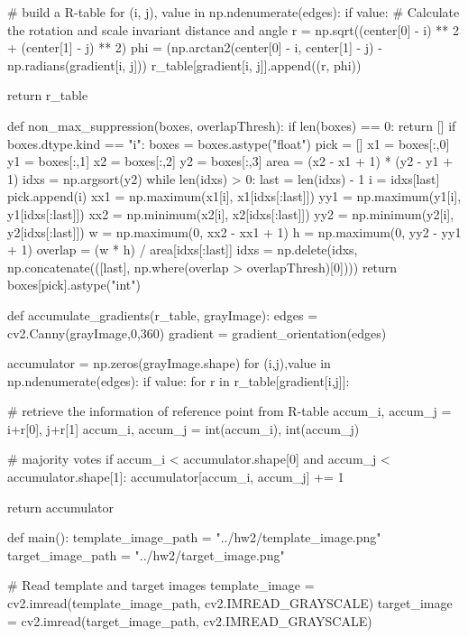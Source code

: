 \documentclass[10pt]{article}
\begin{document}
\begin{python}
    # build a R-table
    for (i, j), value in np.ndenumerate(edges):
        if value:
            # Calculate the rotation and scale invariant distance and angle
            r = np.sqrt((center[0] - i) ** 2 + (center[1] - j) ** 2)
            phi = (np.arctan2(center[0] - i, center[1] - j) - np.radians(gradient[i, j])) %
            r_table[gradient[i, j]].append((r, phi))

    return r_table

def non_max_suppression(boxes, overlapThresh):
    if len(boxes) == 0:
        return []
    if boxes.dtype.kind == "i":
        boxes = boxes.astype("float")
    pick = []
    x1 = boxes[:,0]
    y1 = boxes[:,1]
    x2 = boxes[:,2]
    y2 = boxes[:,3]
    area = (x2 - x1 + 1) * (y2 - y1 + 1)
    idxs = np.argsort(y2)
    while len(idxs) > 0:
        last = len(idxs) - 1
        i = idxs[last]
        pick.append(i)
        xx1 = np.maximum(x1[i], x1[idxs[:last]])
        yy1 = np.maximum(y1[i], y1[idxs[:last]])
        xx2 = np.minimum(x2[i], x2[idxs[:last]])
        yy2 = np.minimum(y2[i], y2[idxs[:last]])
        w = np.maximum(0, xx2 - xx1 + 1)
        h = np.maximum(0, yy2 - yy1 + 1)
        overlap = (w * h) / area[idxs[:last]]
        idxs = np.delete(idxs, np.concatenate(([last], np.where(overlap > overlapThresh)[0])))
    return boxes[pick].astype("int")

def accumulate_gradients(r_table, grayImage):
    edges = cv2.Canny(grayImage,0,360)
    gradient = gradient_orientation(edges)
    
    accumulator = np.zeros(grayImage.shape)
    for (i,j),value in np.ndenumerate(edges):
        if value:
            for r in r_table[gradient[i,j]]:

                # retrieve the information of reference point from R-table
                accum_i, accum_j = i+r[0], j+r[1]
                accum_i, accum_j = int(accum_i), int(accum_j)

                # majority votes
                if accum_i < accumulator.shape[0] and accum_j < accumulator.shape[1]:
                    accumulator[accum_i, accum_j] += 1
                    
    return accumulator

def main():
    template_image_path = "../hw2/template_image.png"
    target_image_path = "../hw2/target_image.png"

    # Read template and target images
    template_image = cv2.imread(template_image_path, cv2.IMREAD_GRAYSCALE)
    target_image = cv2.imread(target_image_path, cv2.IMREAD_GRAYSCALE)


\end{python}
\end{document}
